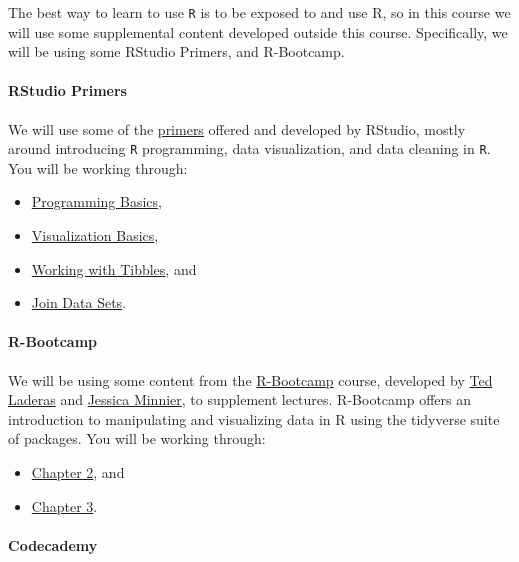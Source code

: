\documentclass[
  letterpaper,
  DIV=11,
  numbers=noendperiod]{scrartcl}
\let\oldparagraph\paragraph
\renewcommand{\paragraph}[1]{\oldparagraph{#1}\mbox{}}
\providecommand{\tightlist}{%
  \setlength{\itemsep}{0pt}\setlength{\parskip}{0pt}}\usepackage{longtable,booktabs,array}
\begin{document}
The best way to learn to use \texttt{R} is to be exposed to and use R,
so in this course we will use some supplemental content developed
outside this course. Specifically, we will be using some RStudio
Primers, and R-Bootcamp.

\hypertarget{rstudio-primers}{%
\paragraph{RStudio Primers}\label{rstudio-primers}}

We will use some of the
\href{https://posit.cloud/learn/primers}{primers} offered and developed
by RStudio, mostly around introducing \texttt{R} programming, data
visualization, and data cleaning in \texttt{R}. You will be working
through:

\begin{itemize}
\tightlist
\item
  \href{https://posit.cloud/learn/primers/1.2}{Programming Basics},
\item
  \href{https://posit.cloud/learn/primers/1.1}{Visualization Basics},
\item
  \href{https://posit.cloud/learn/primers/2.1}{Working with Tibbles},
  and
\item
  \href{https://posit.cloud/learn/primers/4.3}{Join Data Sets}.
\end{itemize}

\hypertarget{r-bootcamp}{%
\paragraph{R-Bootcamp}\label{r-bootcamp}}

We will be using some content from the
\href{https://r-bootcamp.netlify.com/}{R-Bootcamp} course, developed by
\href{https://laderast.github.io/}{Ted Laderas} and
\href{http://jessicaminnier.com/}{Jessica Minnier}, to supplement
lectures. R-Bootcamp offers an introduction to manipulating and
visualizing data in R using the tidyverse suite of packages. You will be
working through:

\begin{itemize}
\tightlist
\item
  \href{https://r-bootcamp.netlify.app/chapter2}{Chapter 2}, and
\item
  \href{https://r-bootcamp.netlify.app/chapter3}{Chapter 3}.
\end{itemize}

\hypertarget{codecademy}{%
\paragraph{Codecademy}\label{codecademy}}
\end{document}

